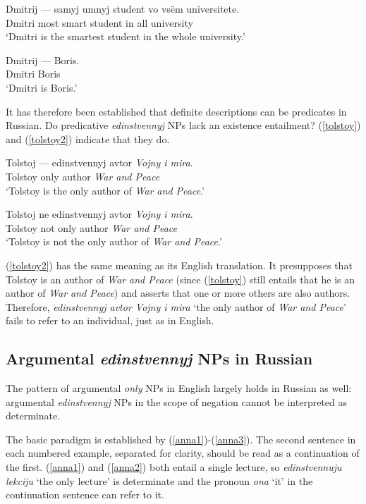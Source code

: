 \begin{exe}
	\ex \label{dmitri-boris} \gll Dmitrij --- samyj umnyj student vo vs\"{e}m universitete.\\
	Dmitri {} most smart student in all university\\
	\glt `Dmitri is the smartest student in the whole university.'

	\ex \label{dmitri-boris2} \gll Dmitrij --- Boris.\\
	Dmitri {} Boris\\
	\glt `Dmitri is Boris.'
\end{exe}

It has therefore been established that definite descriptions can be predicates in Russian. Do predicative \textit{edinstvennyj} NPs lack an existence entailment? (\ref{tolstoy}) and (\ref{tolstoy2}) indicate that they do.

\begin{exe}
	\ex \label{tolstoy} \gll Tolstoj --- edinstvennyj avtor \textit{Vojny i mira}.\\
	Tolstoy {} only author \textit{War and Peace}\\
	\glt `Tolstoy is the only author of \textit{War and Peace}.'

	\ex \label{tolstoy2} \gll Tolstoj ne edinstvennyj avtor \textit{Vojny i mira}.\\
	Tolstoy not only author \textit{War and Peace}\\
	\glt `Tolstoy is not the only author of \textit{War and Peace}.'
\end{exe}

(\ref{tolstoy2}) has the same meaning as its English translation. It presupposes that Tolstoy is an author of \textit{War and Peace} (since (\ref{tolstoy}) still entails that he is an author of \textit{War and Peace}) and asserts that one or more others are also authors. Therefore, \textit{edinstvennyj avtor Vojny i mira} `the only author of \textit{War and Peace}' fails to refer to an individual, just as in English.

\subsection{Argumental \textit{edinstvennyj} NPs in Russian}
The pattern of argumental \textit{only} NPs in English largely holds in Russian as well: argumental \textit{edinstvennyj} NPs in the scope of negation cannot be interpreted as determinate.

The basic paradigm is established by (\ref{anna1})-(\ref{anna3}). The second sentence in each numbered example, separated for clarity, should be read as a continuation of the first. (\ref{anna1}) and (\ref{anna2}) both entail a single lecture, so \textit{edinstvennuju lekciju} `the only lecture' is determinate and the pronoun \textit{ona} `it' in the continuation sentence can refer to it.

